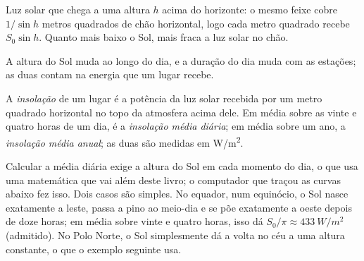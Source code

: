 \begin{omfigure}

{\small Luz solar que chega a uma altura $h$ acima do horizonte: o mesmo
feixe cobre $1/\sin h$ metros quadrados de chão horizontal, logo cada metro
quadrado recebe $S_0 \sin h$. Quanto mais baixo o Sol, mais fraca a luz
solar no chão.}
\end{omfigure}

A altura do Sol muda ao longo do dia, e a duração do dia muda com as
estações; as duas contam na energia que um lugar recebe.

\begin{definition}[Insolação]\label{def:g10:earth-energy-budget:insolation}
A \emph{insolação} de um lugar é a potência da
luz solar recebida por um metro quadrado horizontal no topo da atmosfera
acima dele. Em média sobre as vinte e quatro horas de um dia, é a
\emph{insolação média diária}; em média sobre um ano, a \emph{insolação
média anual}; as duas são medidas em \unit{W/m^2}.
\end{definition}

Calcular a média diária exige a altura do Sol em cada momento do dia, o que
usa uma matemática que vai além deste livro; o computador que traçou as
curvas abaixo fez isso. Dois casos são simples. No equador, num
equinócio, o Sol nasce exatamente a leste, passa a pino ao meio-dia e se
põe exatamente a oeste depois de doze horas; em média sobre vinte e quatro
horas, isso dá $S_0/\pi \approx \qty{433}{W/m^2}$ (admitido). No Polo
Norte, o Sol simplesmente dá a volta no céu a uma altura constante, o que o
exemplo seguinte usa.

